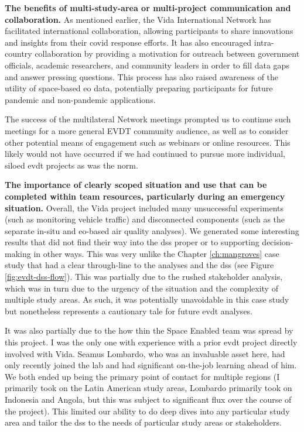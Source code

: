 \textbf{The benefits of multi-study-area or multi-project communication and collaboration.} As mentioned earlier, the Vida International Network has facilitated international collaboration, allowing participants to share innovations and insights from their \ac{covid} response efforts. It has also encouraged intra-country collaboration by providing a motivation for outreach between government officials, academic researchers, and community leaders in order to fill data gaps and answer pressing questions. This process has also raised awareness of the utility of space-based \ac{eo} data, potentially preparing participants for future pandemic and non-pandemic applications. 

The success of the multilateral Network meetings prompted us to continue such meetings for a more general EVDT community audience, as well as to consider other potential means of engagement such as webinars or online resources. This likely would not have occurred if we had continued to pursue more individual, siloed \ac{evdt} projects as was the norm.

\textbf{The importance of clearly scoped situation and use that can be completed within team resources, particularly during an emergency situation.} Overall, the Vida project included many unsuccessful experiments (such as monitoring vehicle traffic) and disconnected components (such as the separate in-situ and \ac{eo}-based air quality analyses). We generated some interesting results that did not find their way into the \ac{dss} proper or to supporting decision-making in other ways. This was very unlike the Chapter \ref{ch:mangroves} case study that had a clear through-line to the analyses and the \ac{dss} (see Figure \ref{fig:evdt-dss-flow}). This was partially due to the rushed stakeholder analysis, which was in turn due to the urgency of the situation and the complexity of multiple study areas. As such, it was potentially unavoidable in this case study but nonetheless represents a cautionary tale for future \ac{evdt} analyses.

It was also partially due to the how thin the Space Enabled team was spread by this project. I was the only one with experience with a prior \ac{evdt} project directly involved with Vida. Seamus Lombardo, who was an invaluable asset here, had only recently joined the lab and had significant on-the-job learning ahead of him. We both ended up being the primary point of contact for multiple regions (I primarily took on the Latin American study areas, Lombardo primarily took on Indonesia and Angola, but this was subject to significant flux over the course of the project). This limited our ability to do deep dives into any particular study area and tailor the \ac{dss} to the needs of particular study areas or stakeholders.

